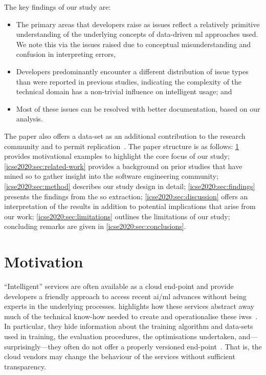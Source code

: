 The key findings of our study are:
\begin{itemize}
\item The primary areas that developers raise as issues reflect a relatively primitive understanding of the underlying concepts of data-driven \gls{ml} approaches used. We note this via the issues raised due to conceptual misunderstanding and confusion in interpreting errors,
\item Developers predominantly encounter a different distribution of issue types than were reported in previous studies, indicating the complexity of the technical domain has a non-trivial influence on intelligent  usage; and
\item Most of these issues can be resolved with better documentation, based on our analysis.
\end{itemize}

The paper also offers a data-set as an additional contribution to the research community and to permit replication~. The paper structure is as follows: \cref{icse2020:sec:motivation} provides motivational examples to highlight the core focus of our study; \cref{icse2020:sec:related-work} provides a background on prior studies that have mined \gls{so} to gather insight into the software engineering community; \cref{icse2020:sec:method} describes our study design in detail; \cref{icse2020:sec:findings} presents the findings from the \gls{so} extraction; \cref{icse2020:sec:discussion} offers an interpretation of the results in addition to potential implications that arise from our work; \cref{icse2020:sec:limitations} outlines the limitations of our study; concluding remarks are given in \cref{icse2020:sec:conclusions}.

\section{Motivation}
\label{icse2020:sec:motivation}

``Intelligent'' services are often available as a cloud end-point and provide developers a friendly approach to access recent \gls{ai}/\gls{ml} advances without being experts in the underlying processes.  highlights how these services abstract away much of the technical know-how needed to create and operationalise these \glspl{iws}~\citep{Ortiz:2017wg}. In particular, they hide information about the training algorithm and data-sets used in training, the evaluation procedures, the optimisations undertaken, and---surprisingly---they often do not offer a properly versioned end-point~\citep{Cummaudo:2019icsme, Ohtake:2019vi}. That is, the cloud vendors may change the behaviour of the services without sufficient transparency.

